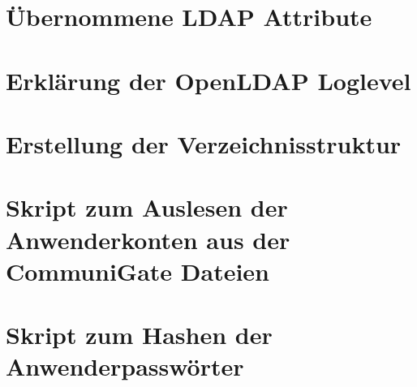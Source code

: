 \documentclass[11pt,a4paper,titlepage=firstiscover]{scrartcl} %
\begin{document}
\appendix
{} %
\newpage
\section{\"Ubernommene LDAP Attribute} \label{sec:LDAP-Attribute}
\newpage
\section{Erkl\"arung der OpenLDAP Loglevel} \label{sec:LDAP-Loglevel}
\newpage
\section{Erstellung der Verzeichnisstruktur}\label{sec:Erstelle-DB}
\newpage
\section{Skript zum Auslesen der Anwenderkonten aus der CommuniGate Dateien}\label{sec:SkriptA}
\newpage
\section{Skript zum Hashen der Anwenderpassw\"orter}\label{sec:SkriptB}

%
%
\end{document}
